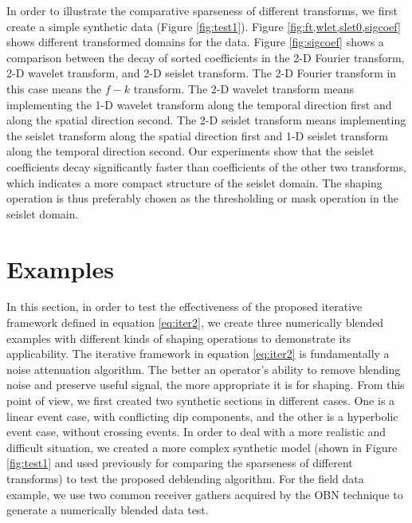In order to illustrate the comparative sparseness of different transforms, we first create a simple synthetic data (Figure \ref{fig:test1}). Figure \ref{fig:ft,wlet,slet0,sigcoef} shows different transformed domains for the data. Figure \ref{fig:sigcoef} shows a comparison between the decay of sorted coefficients in the 2-D Fourier transform, 2-D wavelet transform, and 2-D seislet transform. The 2-D Fourier transform in this case means the $f-k$ transform. The 2-D wavelet transform means implementing the 1-D wavelet transform along the temporal direction first and along the spatial direction second. The 2-D seislet transform means implementing the seislet transform along the spatial direction first and 1-D seislet transform along the temporal direction second. Our experiments show that the seislet coefficients decay significantly faster than coefficients of the other two transforms, which indicates a more compact structure of the seislet domain. The shaping operation is thus preferably chosen as the thresholding or mask operation in the seislet domain.





\section{Examples}
In this section, in order to test the effectiveness of the proposed iterative framework defined in equation \ref{eq:iter2}, we create three numerically blended examples with different kinds of shaping operations to demonstrate its applicability. The iterative framework in equation \ref{eq:iter2} is fundamentally a noise attenuation algorithm. The better an operator's ability to remove blending noise and preserve useful signal, the more appropriate it is for shaping. From this point of view, we first created two synthetic sections in different cases. One is a linear event case, with conflicting dip components, and the other is a hyperbolic event case, without crossing events. In order to deal with a more realistic and difficult situation, we created a more complex synthetic model (shown in Figure \ref{fig:test1} and used previously for comparing the sparseness of different transforms) to test the proposed deblending algorithm. For the field data example, we use two common receiver gathers acquired by the OBN technique to generate a numerically blended data test. 

